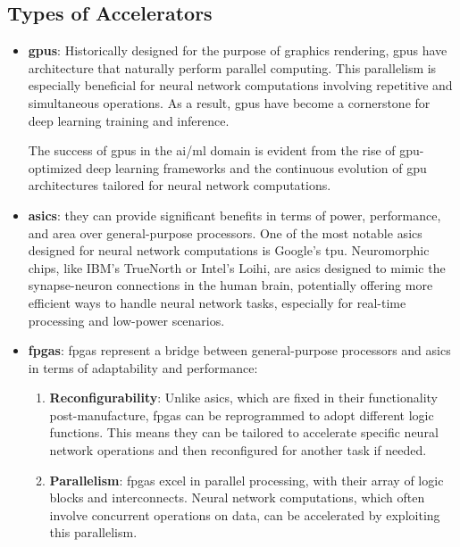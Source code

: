 \subsection{Types of Accelerators}
\begin{itemize}
	\item \textbf{\glspl{gpu}}: Historically designed for the purpose of graphics rendering, \glspl{gpu} have architecture that naturally perform parallel computing. This parallelism is especially beneficial for neural network computations involving repetitive and simultaneous operations. As a result, \glspl{gpu} have become a cornerstone for deep learning training and inference.
	
	The success of \glspl{gpu} in the \gls{ai}/\gls{ml} domain is evident from the rise of \gls{gpu}-optimized deep learning frameworks and the continuous evolution of \gls{gpu} architectures tailored for neural network computations.
	
	
	\item \textbf{\glspl{asic}}: they can provide significant benefits in terms of power, performance, and area over general-purpose processors. One of the most notable \glspl{asic} designed for neural network computations is Google's \gls{tpu}. Neuromorphic chips, like IBM's TrueNorth or Intel's Loihi, are \glspl{asic} designed to mimic the synapse-neuron connections in the human brain, potentially offering more efficient ways to handle neural network tasks, especially for real-time processing and low-power scenarios.
	
	\item \textbf{\glspl{fpga}}: \glspl{fpga} represent a bridge between general-purpose processors and \glspl{asic} in terms of adaptability and performance:
	
	\begin{enumerate}
		\item \textbf{Reconfigurability}: Unlike \glspl{asic}, which are fixed in their functionality post-manufacture, \glspl{fpga} can be reprogrammed to adopt different logic functions. This means they can be tailored to accelerate specific neural network operations and then reconfigured for another task if needed.
		
		\item \textbf{Parallelism}: \glspl{fpga} excel in parallel processing, with their array of logic blocks and interconnects. Neural network computations, which often involve concurrent operations on data, can be accelerated by exploiting this parallelism.
		

\end{enumerate}
\end{itemize}
